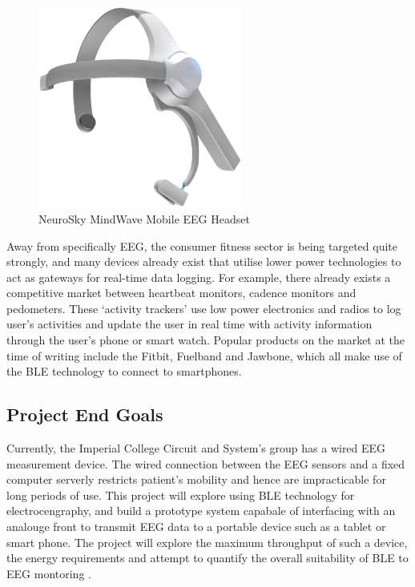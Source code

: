 \documentclass[]{article}
\begin{document}
\begin{figure}[H]
	\begin{center}
		\includegraphics[width = 0.6\textwidth]{neurosky}
	\end{center}
	\caption{NeuroSky MindWave Mobile \ac{EEG}  Headset}
	\label{fig:neurosky}
\end{figure}

Away from specifically \ac{EEG}, the consumer fitness sector is being targeted quite strongly, and many devices already exist that utilise lower power technologies to act as gateways for real-time data logging. For example, there already exists a competitive market between heartbeat monitors, cadence monitors and pedometers. These ‘activity trackers’ use low power electronics and radios to log user’s activities and update the user in real time with activity information through the user’s phone or smart watch. Popular products on the market at the time of writing include the Fitbit, Fuelband and Jawbone, which all make use of the \ac{BLE} technology to connect to smartphones.

\subsection{Project End Goals}

Currently, the Imperial College Circuit and System's group has a wired \ac{EEG} measurement device. The wired connection between the \ac{EEG} sensors and a fixed computer serverly restricts patient's mobility and hence are impracticable for long periods of use. This project will explore using \ac{BLE} technology for electrocengraphy, and build a prototype system capabale of interfacing with an analouge front to transmit \ac{EEG} data to a portable device such as a tablet or smart phone.  The project will explore the maximum throughput of such a device, the energy requirements and attempt to quantify the overall suitability of \ac{BLE} to \ac{EEG} montoring .
\end{document}
